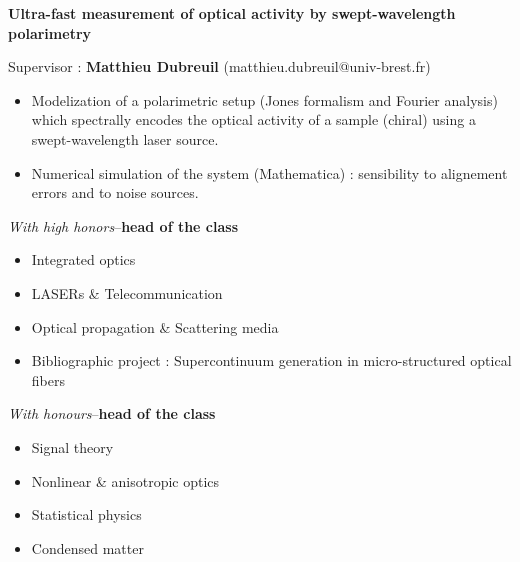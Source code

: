\documentclass[9pt,a4paper,academicons]{altacv}
\begin{document}

\textbf{Ultra-fast measurement of optical activity by swept-wavelength polarimetry}\smallskip
	
	
	
	Supervisor : \textbf{Matthieu Dubreuil} (matthieu.dubreuil@univ-brest.fr)
	\smallskip
\small{
	\begin{itemize}
		\item Modelization of a polarimetric setup (Jones formalism and Fourier analysis) which spectrally encodes the optical activity of a sample (chiral) using a swept-wavelength laser source.
		\item Numerical simulation of the system (Mathematica) : sensibility to alignement errors and to noise sources.
	\end{itemize}
}





\hfill \textit{With high honors}--\textbf{head of the class}
\vspace{-1em}\small{
	
  \begin{itemize}
    \item Integrated optics
    \item LASERs \& Telecommunication
    \item Optical propagation  \& Scattering media
    \item Bibliographic project : Supercontinuum generation in micro-structured optical fibers
  \end{itemize}
}

\divider

\hfill\textit{With honours}--\textbf{head of the class}
\vspace{-1em}\small{
  \begin{itemize}
    \item Signal theory
    \item Nonlinear \& anisotropic optics
    \item Statistical physics
    \item Condensed matter
  \end{itemize}
}
\divider
\end{document}
